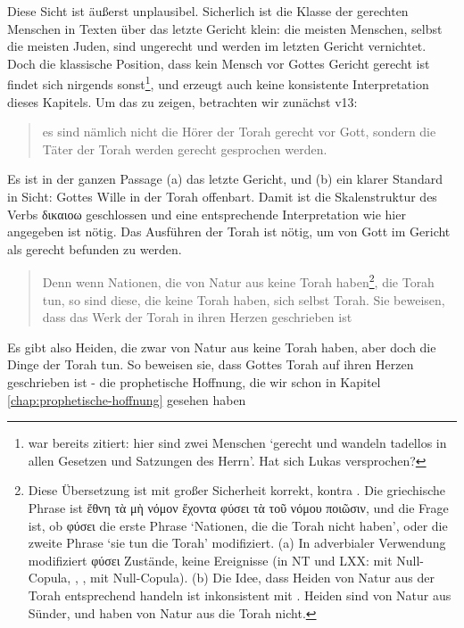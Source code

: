 Diese Sicht ist äußerst unplausibel. Sicherlich ist die Klasse der gerechten Menschen in Texten über das letzte Gericht
klein: die meisten Menschen, selbst die meisten Juden, sind ungerecht und werden im letzten Gericht vernichtet.
Doch die klassische Position, dass kein Mensch vor Gottes Gericht gerecht ist findet sich nirgends sonst\footnote{
	 war bereits zitiert: hier sind zwei Menschen `gerecht und wandeln tadellos in allen Gesetzen und Satzungen des Herrn'.
	Hat sich Lukas versprochen?
}, und erzeugt auch keine konsistente Interpretation dieses Kapitels.
Um das zu zeigen, betrachten wir zunächst v13:
\begin{quote}
	es sind nämlich nicht die Hörer der Torah gerecht vor Gott, sondern die Täter der Torah werden gerecht gesprochen werden.
\end{quote}
Es ist in der ganzen Passage (a) das letzte Gericht, und (b) ein klarer Standard in Sicht: Gottes Wille in der Torah offenbart.
Damit ist die Skalenstruktur des Verbs δικαιοω geschlossen und eine entsprechende Interpretation wie hier angegeben ist nötig.
Das Ausführen der Torah ist nötig, um von Gott im Gericht als gerecht befunden zu werden.
\begin{quote}
	Denn wenn Nationen, die von Natur aus keine Torah haben\footnote{
		Diese Übersetzung ist mit großer Sicherheit korrekt, kontra \Cite{nicnt-romans}.
		Die griechische Phrase ist ἔθνη τὰ μὴ νόμον ἔχοντα φύσει τὰ τοῦ νόμου ποιῶσιν, und die Frage ist, ob φύσει die erste Phrase `Nationen, die die Torah nicht haben',
		oder die zweite Phrase `sie tun die Torah' modifiziert.
		(a) In adverbialer Verwendung modifiziert φύσει Zustände, keine Ereignisse (in NT und LXX:  mit Null-Copula, , ,  mit Null-Copula).
		(b) Die Idee, dass Heiden von Natur aus der Torah entsprechend handeln ist inkonsistent mit . Heiden sind von Natur aus Sünder, und haben von Natur aus die Torah nicht.
	}, die Torah tun,
	so sind diese, die keine Torah haben, sich selbst Torah.
	Sie beweisen, dass das Werk der Torah in ihren Herzen geschrieben ist
\end{quote}
Es gibt also Heiden, die zwar von Natur aus keine Torah haben, aber doch die Dinge der Torah tun.
So beweisen sie, dass Gottes Torah auf ihren Herzen geschrieben ist - die prophetische Hoffnung, die wir schon in Kapitel \ref{chap:prophetische-hoffnung} gesehen haben

